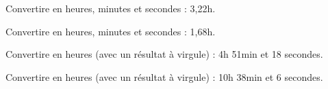 \begin{multicols}{2}
    
    Convertire en heures, minutes et secondes : 3,22h.

    
    Convertire en heures, minutes et secondes : 1,68h.

\end{multicols}

\begin{multicols}{2}
    
    Convertire en heures (avec un résultat à virgule) : 4h 51min et 18 secondes. 

    
    Convertire en heures (avec un résultat à virgule) : 10h 38min et 6 secondes. 

\end{multicols}